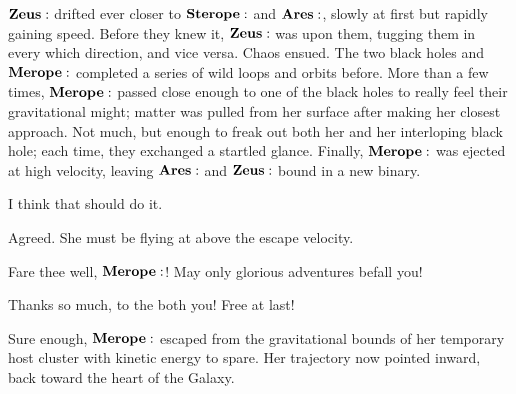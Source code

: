 \documentclass[main.tex]{subfiles}
\begin{document}
$\Zeus$ drifted ever closer to $\Sterope$ and $\Ares$, slowly at first but rapidly gaining speed.  Before they knew it, $\Zeus$ was upon them, tugging them in every which direction, and vice versa.  Chaos ensued.  The two black holes and $\Merope$ completed a series of wild loops and orbits before.  More than a few times, $\Merope$ passed close enough to one of the black holes to really feel their gravitational might;  matter was pulled from her surface after making her closest approach. Not much, but enough to freak out both her and her interloping black hole; each time, they exchanged a startled glance.  Finally, $\Merope$ was ejected at high velocity, leaving $\Ares$ and $\Zeus$ bound in a new binary.    

\Ares I think that should do it.  

\Zeus Agreed.  She must be flying at above the escape velocity.  

\Ares Fare thee well, $\Merope$!  May only glorious adventures befall you!

\Merope Thanks so much, to the both you!  Free at last!

Sure enough, $\Merope$ escaped from the gravitational bounds of her temporary host cluster with kinetic energy to spare.  Her trajectory now pointed inward, back toward the heart of the Galaxy.
\end{document}

